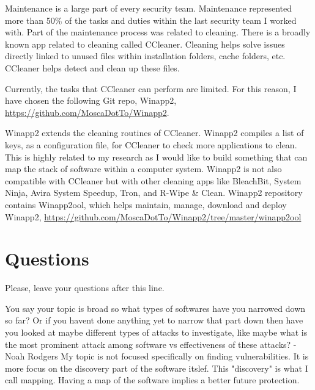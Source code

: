 Maintenance is a large part of every security team. Maintenance represented more than 50\% of the tasks and duties within the last security team I worked with. Part of the maintenance process was related to cleaning. There is a broadly known app related to cleaning called CCleaner. Cleaning helps solve issues directly linked to unused files within installation folders, cache folders, etc. CCleaner helps detect and clean up these files.

Currently, the tasks that CCleaner can perform are limited. For this reason, I have chosen the following Git repo, Winapp2, \url{https://github.com/MoscaDotTo/Winapp2}.

Winapp2 extends the cleaning routines of CCleaner. Winapp2 compiles a list of keys, as a configuration file, for CCleaner to check more applications to clean.
This is highly related to my research as I would like to build something that can map the stack of software within a computer system.
Winapp2 is not also compatible with CCleaner but with other cleaning apps like BleachBit, System Ninja, Avira System Speedup, Tron, and R-Wipe \& Clean. Winapp2 repository contains Winapp2ool, which helps maintain, manage, download and deploy Winapp2, \url{https://github.com/MoscaDotTo/Winapp2/tree/master/winapp2ool}


\section{Questions}
Please, leave your questions after this line.

You say your topic is broad so what types of softwares have you narrowed down so far? Or if you havent done anything yet to narrow that part down then have you looked at maybe different types of attacks to investigate, like maybe what is the most prominent attack among software vs effectiveness of these attacks? -Noah Rodgers
My topic is not focused specifically on finding vulnerabilities. It is more focus on the discovery part of the software itslef. This "discovery" is what I call mapping. Having a map of the software implies a better future protection.





%
